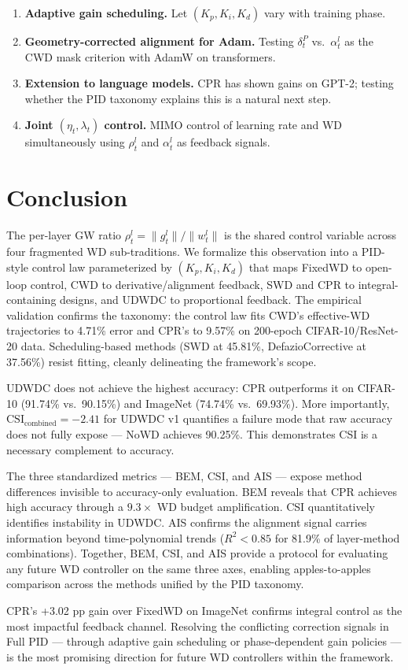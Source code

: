 \documentclass{article}
\begin{document}
\begin{enumerate}
\item \textbf{Adaptive gain scheduling.} Let $(K_p, K_i, K_d)$ vary with training phase.
\item \textbf{Geometry-corrected alignment for Adam.} Testing $\delta_t^P$ vs.~$\alpha_t^l$ as the CWD mask criterion with AdamW on transformers.
\item \textbf{Extension to language models.} CPR has shown gains on GPT-2; testing whether the PID taxonomy explains this is a natural next step.
\item \textbf{Joint $(\eta_t, \lambda_t)$ control.} MIMO control of learning rate and WD simultaneously using $\rho_t^l$ and $\alpha_t^l$ as feedback signals.
\end{enumerate}

\section{Conclusion}

The per-layer GW ratio $\rho_t^l = \|g_t^l\| / \|w_t^l\|$ is the shared control variable across four fragmented WD sub-traditions. We formalize this observation into a PID-style control law parameterized by $(K_p, K_i, K_d)$ that maps FixedWD to open-loop control, CWD to derivative/alignment feedback, SWD and CPR to integral-containing designs, and UDWDC to proportional feedback. The empirical validation confirms the taxonomy: the control law fits CWD's effective-WD trajectories to 4.71\% error and CPR's to 9.57\% on 200-epoch CIFAR-10/ResNet-20 data. Scheduling-based methods (SWD at 45.81\%, DefazioCorrective at 37.56\%) resist fitting, cleanly delineating the framework's scope.

UDWDC does not achieve the highest accuracy: CPR outperforms it on CIFAR-10 (91.74\% vs.~90.15\%) and ImageNet (74.74\% vs.~69.93\%). More importantly, $\text{CSI}_{\text{combined}} = -2.41$ for UDWDC v1 quantifies a failure mode that raw accuracy does not fully expose --- NoWD achieves 90.25\%. This demonstrates CSI is a necessary complement to accuracy.

The three standardized metrics --- BEM, CSI, and AIS --- expose method differences invisible to accuracy-only evaluation. BEM reveals that CPR achieves high accuracy through a $9.3\times$ WD budget amplification. CSI quantitatively identifies instability in UDWDC. AIS confirms the alignment signal carries information beyond time-polynomial trends ($R^2 < 0.85$ for 81.9\% of layer-method combinations). Together, BEM, CSI, and AIS provide a protocol for evaluating any future WD controller on the same three axes, enabling apples-to-apples comparison across the methods unified by the PID taxonomy.

CPR's +3.02 pp gain over FixedWD on ImageNet confirms integral control as the most impactful feedback channel. Resolving the conflicting correction signals in Full PID --- through adaptive gain scheduling or phase-dependent gain policies --- is the most promising direction for future WD controllers within the framework.



\end{document}
